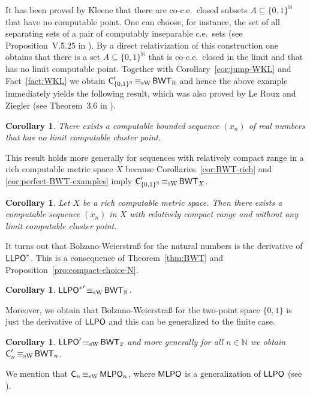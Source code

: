 \documentclass[a4paper]{amsart}
\def\IN{{\mathbb{N}}}
\def\IR{{\mathbb{R}}}
\def\In{\subseteq}
\def\Cantor{{\{0,1\}^\IN}}
\def\LLPO{\text{\rm\sffamily LLPO}}
\def\BWT{\text{\rm\sffamily BWT}}
\def\C{\mbox{\rm\sffamily C}}
\def\LLPO{\mbox{\rm\sffamily LLPO}}
\def\MLPO{\mbox{\rm\sffamily MLPO}}
\def\equivSW{\mathop{\equiv_{\mathrm{sW}}}}
\newtheorem{corollary}[theorem]{Corollary}
\theoremstyle{definition}
\begin{document}
It has been proved by Kleene that there are co-c.e.\ closed subsets $A\In\Cantor$ that have
no computable point. One can choose, for instance, the set of all separating sets
of a pair of computably inseparable c.e.\ sets (see Proposition~V.5.25 in \cite{Odi89}).
By a direct relativization of this construction one obtains that there
is a set $A\In\Cantor$ that is co-c.e.\ closed in the limit
and that has no limit computable point. 
Together with Corollary~\ref{cor:jump-WKL} and Fact~\ref{fact:WKL} we obtain $\C_{\{0,1\}^\IN}'\equivSW\BWT_\IR$
and hence the above example immediately yields the following result, 
which was also proved by Le Roux and Ziegler (see Theorem~3.6 in \cite{LZ08a}).

\begin{corollary}
\label{cor:BWT-counterexample}
There exists a computable bounded sequence $(x_n)$ of real numbers that has 
no limit computable cluster point.
\end{corollary}

This result holds more generally for sequences with relatively compact range in a rich
computable metric space $X$ because Corollaries~\ref{cor:BWT-rich} and \ref{cor:perfect-BWT-examples}
imply $\C_{\{0,1\}^\IN}'\equivSW\BWT_X$.

\begin{corollary}
\label{cor:BWT-counterexample-rich}
Let $X$ be a rich computable metric space. Then there exists a computable sequence 
$(x_n)$ in $X$ with relatively compact range and without any limit computable cluster point.
\end{corollary}

It turns out that Bolzano-Weierstra\ss{} for the natural numbers is the derivative
of $\LLPO^*$. This is a consequence of Theorem~\ref{thm:BWT}
and Proposition~\ref{pro:compact-choice-N}.

\begin{corollary}
\label{cor:jump-LLPO-star}
${\LLPO^*}'\equivSW\BWT_\IN$.
\end{corollary}

Moreover, we obtain that Bolzano-Weierstra\ss{} for the two-point space $\{0,1\}$ is
just the derivative of $\LLPO$ and this can be generalized to the finite case.

\begin{corollary}
\label{cor:jump-LLPO}
$\LLPO'\equivSW\BWT_2$ and more generally for all $n\in\IN$ we obtain $\C_n'\equivSW\BWT_n$.
\end{corollary}

We mention that $\C_n\equivSW\MLPO_n$, where $\MLPO$ is a generalization of $\LLPO$ (see \cite{BBP}).
\end{document}
